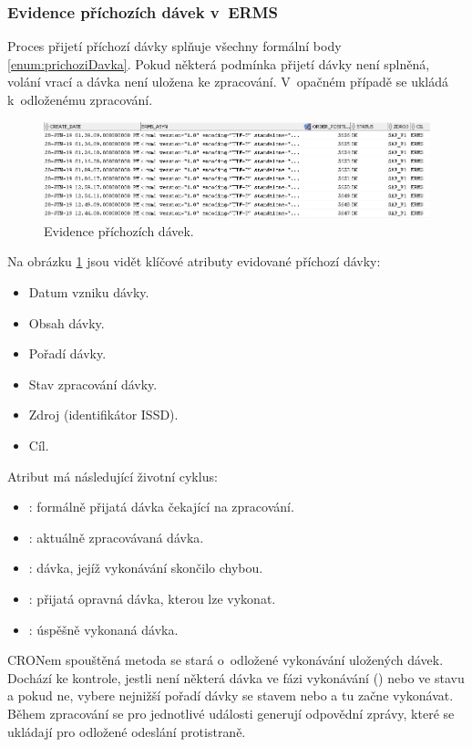 \documentclass[
  master,
  field=ainfp,
  biblatex,
  language=czech,
  glossaries,
  theorems=false,
  index
]{kidiplom}
\begin{document}
\subsubsection{Evidence příchozích dávek v~ERMS}
Proces přijetí příchozí dávky splňuje všechny formální body \ref{enum:prichoziDavka}. Pokud některá podmínka přijetí dávky není splněná, volání vrací  a dávka není uložena ke zpracování. V~opačném případě se ukládá k~odloženému zpracování.

\begin{figure}[h]\label{im:prichoziDavka}
  \centerline{\includegraphics[width=0.9\linewidth]{./images/IncommingBatch.png}} 
  \caption{Evidence příchozích dávek.} 
\end{figure}

Na obrázku \ref{im:prichoziDavka} jsou vidět klíčové atributy evidované příchozí dávky:
\begin{itemize}
	\item Datum vzniku dávky.
	\item Obsah dávky.
	\item Pořadí dávky.
	\item Stav zpracování dávky.
	\item Zdroj (identifikátor ISSD).
	\item Cíl.
\end{itemize}

Atribut  má následující životní cyklus:
\begin{itemize}
	\item {}: formálně přijatá dávka čekající na zpracování.
	\item {}: aktuálně zpracovávaná dávka.
	\item {}: dávka, jejíž vykonávání skončilo chybou.
	\item {}: přijatá opravná dávka, kterou lze vykonat.
	\item {}: úspěšně vykonaná dávka.     
\end{itemize}

CRONem spouštěná metoda se stará o~odložené vykonávání uložených dávek. Dochází ke kontrole, jestli není některá dávka ve fázi vykonávání () nebo ve stavu  a pokud ne, vybere nejnižší pořadí dávky se stavem  nebo  a tu začne vykonávat. Během zpracování se pro jednotlivé události generují odpovědní zprávy, které se ukládají pro odložené odeslání protistraně.
\end{document}
